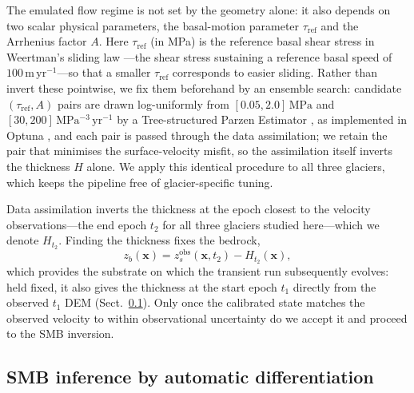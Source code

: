 The emulated flow regime is not set by the geometry alone: it also depends on two
scalar physical parameters, the basal-motion parameter $\tau_{\mathrm{ref}}$ and
the Arrhenius factor $A$. Here $\tau_{\mathrm{ref}}$ (in MPa) is the reference
basal shear stress in Weertman's sliding law \citep{weertman1957}---the shear stress sustaining a
reference basal speed of $100\,\mathrm{m\,yr^{-1}}$---so that a smaller
$\tau_{\mathrm{ref}}$ corresponds
to easier sliding. Rather than invert these pointwise, we fix them beforehand by an
ensemble search: candidate $(\tau_{\mathrm{ref}}, A)$ pairs are drawn log-uniformly
from $[0.05, 2.0]\,\mathrm{MPa}$ and $[30, 200]\,\mathrm{MPa^{-3}\,yr^{-1}}$ by a
Tree-structured Parzen Estimator \citep[TPE;][]{bergstra2011}, as implemented in
Optuna \citep{akiba2019}, and each pair is passed
through the data assimilation; we retain the pair that minimises the
surface-velocity misfit, so the assimilation itself inverts the thickness $H$ alone.
We apply this identical procedure to all three glaciers, which keeps the pipeline
free of glacier-specific tuning. 

Data assimilation inverts the thickness at the epoch closest to the velocity
observations---the end epoch $t_2$ for all three glaciers studied here---which we
denote $H_{t_2}$. Finding the thickness fixes the bedrock,
\begin{equation}
  z_b(\mathbf{x}) = z_s^{\mathrm{obs}}(\mathbf{x}, t_2) - H_{t_2}(\mathbf{x}),
  \label{eq:bed}
\end{equation}
which provides the substrate on which the transient run subsequently evolves: held
fixed, it also gives the thickness at the start epoch $t_1$ directly from the
observed $t_1$ DEM (Sect.~\ref{sec:inference}).
Only once the calibrated state matches the observed velocity
to within observational uncertainty do we accept it and proceed to the SMB
inversion.

\subsection{SMB inference by automatic differentiation}\label{sec:inference}

